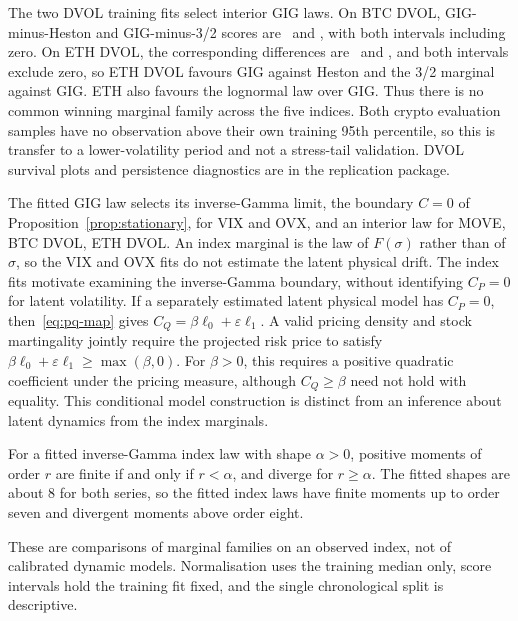 The two DVOL training fits select interior GIG laws. On BTC DVOL, GIG-minus-Heston
and GIG-minus-3/2 scores are \scoreBTCDVOLHeston\ and \scoreBTCDVOLThreeHalf,
with both intervals including zero. On ETH DVOL, the corresponding differences are
\scoreETHDVOLHeston\ and \scoreETHDVOLThreeHalf, and both intervals exclude zero, so
ETH DVOL favours GIG against Heston and the 3/2 marginal against GIG. ETH also favours the
lognormal law over GIG. Thus there is no common winning marginal family across
the five indices. Both crypto evaluation samples have no observation above their
own training 95th percentile, so this is transfer to a lower-volatility period
and not a stress-tail validation. DVOL survival plots and persistence diagnostics are
in the replication package.

The fitted GIG law selects its inverse-Gamma limit, the boundary $C=0$ of
Proposition~\ref{prop:stationary}, for VIX and OVX, and an
interior law for MOVE, BTC DVOL, ETH DVOL. An index marginal is the law of
$F(\sigma)$ rather than of $\sigma$, so the VIX and OVX fits do not estimate the latent
physical drift. The index fits motivate examining the inverse-Gamma boundary,
without identifying $C_P=0$ for latent volatility. If a separately estimated latent
physical model has $C_P=0$, then~\eqref{eq:pq-map} gives
$C_Q=\beta\ell_0+\varepsilon\ell_1$. A valid pricing density and stock martingality
jointly require the projected risk price to satisfy
$\beta\ell_0+\varepsilon\ell_1\geq\max(\beta,0)$.
For $\beta>0$, this requires a positive quadratic coefficient under the pricing
measure, although $C_Q\geq\beta$ need not hold with equality. This conditional
model construction is distinct from an inference about latent dynamics from
the index marginals.

For a fitted inverse-Gamma index law with shape $\alpha>0$, positive moments of
order $r$ are finite if and only if $r<\alpha$, and diverge for $r\geq\alpha$.
The fitted shapes are about 8 for both series, so the fitted index laws have finite
moments up to order seven and divergent moments above order eight.

These are comparisons of marginal families on an observed index, not of calibrated
dynamic models. Normalisation uses the training median only, score intervals hold
the training fit fixed, and the single chronological split is descriptive.

